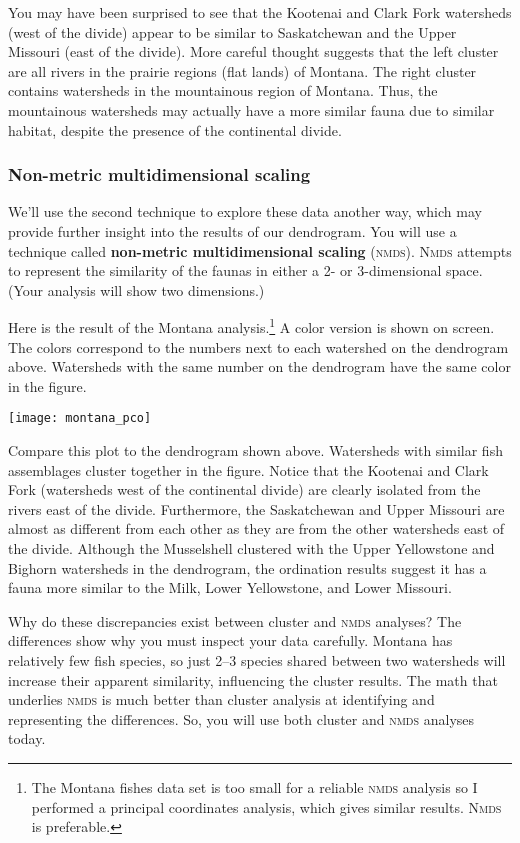 \documentclass[11pt]{article}
\begin{document}
You may have been surprised to see that the Kootenai and Clark Fork watersheds 
(west of the divide) appear to be similar to Saskatchewan and the Upper Missouri 
(east of the divide). More careful thought suggests that the left cluster are all rivers in
the prairie regions (flat lands) of Montana. The right cluster contains watersheds in
the mountainous region of Montana. Thus, the mountainous watersheds may actually
have a more similar fauna due to similar habitat, despite the presence of the continental
divide.


\subsubsection*{Non-metric multidimensional scaling}

We'll use the second technique to explore these data another way, which may provide 
further insight into the results of our dendrogram.  You will use a technique called 
\textbf{non-metric multidimensional scaling} (\textsc{nmds}). \textsc{Nmds} attempts to represent the similarity of the faunas in either a 2- or 3-dimensional space. (Your analysis will show two dimensions.)

Here is the result of the Montana analysis.\footnote{The Montana fishes data set
is too small for a reliable \textsc{nmds} analysis so I performed a principal
coordinates analysis, which gives similar results. \textsc{Nmds} is preferable.} A 
color version is shown on screen. The colors correspond to the numbers next to each
watershed on the dendrogram above. Watersheds with the same number on the dendrogram
have the same color in the figure.

\begin{center}
	\texttt{[image: montana\_pco]}
\end{center}

Compare this plot to the dendrogram shown above. Watersheds with similar fish assemblages cluster
together in the figure. Notice that the Kootenai and Clark Fork (watersheds west of the 
continental divide) are clearly isolated from the rivers east of the divide. Furthermore, 
the Saskatchewan and Upper Missouri are almost as different from each other as they are 
from the other watersheds east of the divide. Although the Musselshell clustered with the 
Upper Yellowstone and Bighorn watersheds in the dendrogram, the ordination results 
suggest it has a fauna more similar to the Milk, Lower Yellowstone, and Lower Missouri.

Why do these discrepancies exist between cluster and \textsc{nmds} analyses? The
differences show why you must inspect your data carefully. Montana has relatively few fish
species, so just 2--3 species shared between two watersheds will increase their apparent similarity, 
influencing the cluster results. The math that underlies \textsc{nmds}
is much better than cluster analysis at identifying and representing the differences. So, you will use both cluster and \textsc{nmds} analyses
today.
\end{document}
